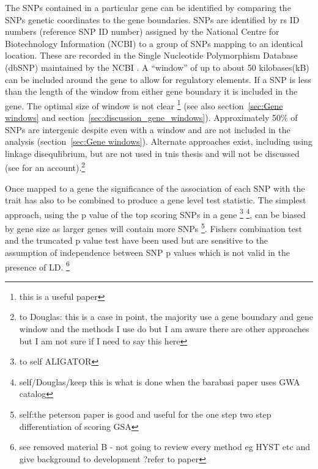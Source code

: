 The SNPs contained in a particular gene can be identified by comparing the SNPs genetic coordinates to the gene boundaries.
SNPs are identified by rs ID numbers (reference SNP ID number) assigned by the National Centre for Biotechnology Information (NCBI) to a group of SNPs mapping to an identical location. These are recorded in the Single Nucleotide Polymorphism Database (dbSNP) maintained by the NCBI \cite{kitts2002single}.   A ``window'' of up to about 50 kilobases(kB) can be included around the gene to allow for regulatory elements. If a SNP is less than the length of the window from either gene boundary it is included in the gene. The optimal size of window is not clear \cite{petersen2013assessing}\footnote{this is a useful paper} (see also section~\ref{sec:Gene windows} and section~\ref{sec:discussion_gene_windows}). Approximately 50\% of SNPs are intergenic despite even with a window and are not included in the analysis (section~\ref{sec:Gene windows}). Alternate approaches exist, including using linkage disequlibrium, but are not used in tnis thesis and will not be discussed (see \cite{way2017implicating} for an account).\footnote{to Douglas: this is a case in point, the majority use a gene boundary and gene window and the methods I use do but I am aware there are other approaches but I am not sure if I need to say this here}

Once mapped to a gene the significance  of the association of each SNP with the trait has also to be combined to produce a gene level test statistic. The simplest approach, using the p value of the top scoring SNPs in a gene\cite{wang2007pathway} \cite{holmans2009gene}
\footnote{to self ALIGATOR}
\footnote{self/Douglas/keep this is what is done when the barabasi paper uses GWA catalog}, can be biased by gene size as larger genes will contain more SNPs \cite{wang2007pathway}\cite{elbers2009using}\cite{petersen2013assessing}
\footnote{self:the peterson paper is good and useful for the one step two step differentiation of scoring GSA}. Fishers combination test\cite{curtis2008simple} and the truncated p value test\cite{yang2009genome} have been used but are sensitive to the assumption of independence between SNP p values which is not valid in the presence of LD\cite{li2011gates}.
\footnote{see removed material B - not going to review every method eg HYST etc and give background to development ?refer to paper}
 
